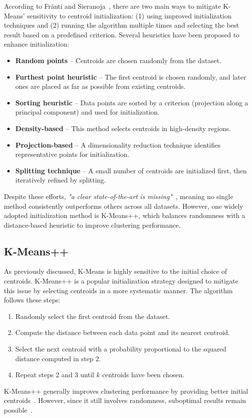 \documentclass[10pt,twocolumn,letterpaper]{article}
\begin{document}
According to Fränti and Sieranoja~\cite{FRANTI201995}, there are two main ways
to mitigate K-Means’ sensitivity to centroid initialization: (1) using improved
initialization techniques and (2) running the algorithm multiple times and
selecting the best result based on a predefined criterion. Several heuristics
have been proposed to enhance initialization:
\begin{itemize}
    \item \textbf{Random points} – Centroids are chosen randomly from the dataset.
    \item \textbf{Furthest point heuristic} – The first centroid is chosen randomly, and later ones are placed as far as possible from existing centroids.
    \item \textbf{Sorting heuristic} – Data points are sorted by a criterion (\eg projection along a principal component) and used for initialization.
    \item \textbf{Density-based} – This method selects centroids in high-density regions.
    \item \textbf{Projection-based} – A dimensionality reduction technique identifies representative points for initialization.
    \item \textbf{Splitting technique} – A small number of centroids are initialized first, then iteratively refined by splitting.
\end{itemize}
Despite these efforts, \textit{"a clear state-of-the-art is
    missing"}~\cite{FRANTI201995}, meaning no single method consistently
outperforms others across all datasets. However, one widely adopted
initialization method is K-Means++, which balances randomness with a
distance-based heuristic to improve clustering performance.


\subsection{K-Means++}\label{subsec:k-means++}

As previously discussed, K-Means is highly sensitive to the initial choice of
centroids. K-Means++ is a popular initialization strategy designed to mitigate
this issue by selecting centroids in a more systematic manner. The algorithm
follows these steps:
\begin{enumerate}
    \item Randomly select the first centroid from the dataset.
    \item Compute the distance between each data point and its nearest centroid.
    \item Select the next centroid with a probability proportional to the squared
          distance computed in step 2.
    \item Repeat steps 2 and 3 until $k$ centroids have been chosen.
\end{enumerate}
K-Means++ generally improves clustering performance by providing better initial
centroids~\cite{FRANTI201995}. However, since it still involves randomness,
suboptimal results remain possible~\cite{deuschle2019, Abdullah10601123}.
\end{document}
